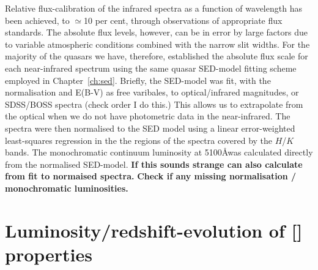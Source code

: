 Relative flux-calibration of the infrared spectra as a function of wavelength has been achieved, to $\simeq$10 per cent, through observations of appropriate flux standards. 
The absolute flux levels, however, can be in error by large factors due to variable atmospheric conditions combined with the narrow slit widths. 
For the majority of the quasars we have, therefore, established the absolute flux scale for each near-infrared spectrum using the same quasar SED-model fitting scheme employed in Chapter~\ref{ch:sed}.
Briefly, the SED-model was fit, with the normalisation and E(B-V) as free varibales, to optical/infrared magnitudes, or SDSS/BOSS spectra (check order I do this.)
This allows us to extrapolate from the optical when we do not have photometric data in the near-infrared. 
The spectra were then normalised to the SED model using a linear error-weighted least-squares regression in the the regions of the spectra covered by the $H$/$K$ bands. 
The monochromatic continuum luminosity at 5100\AA was calculated directly from the normalised SED-model. 
{\bf If this sounds strange can also calculate from fit to normaised spectra.}
{\bf Check if any missing normalisation / monochromatic luminosities.} 

















\section{Luminosity/redshift-evolution of [] properties}

